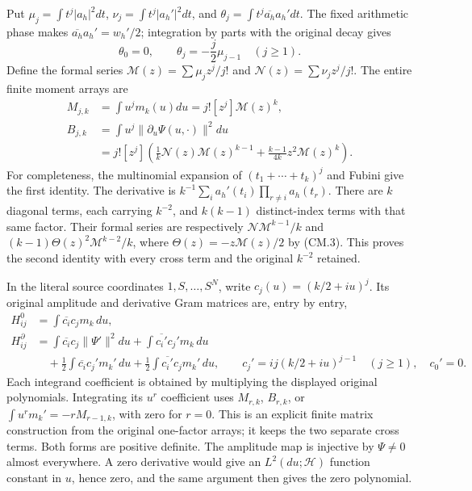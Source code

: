 Put \(\mu_j=\int t^j|a_h|^2dt\),
\(\nu_j=\int t^j|a_h'|^2dt\), and
\(\theta_j=\int t^j\overline{a_h}a_h'dt\).
The fixed arithmetic phase makes \(\overline{a_h}a_h'=w_h'/2\);
integration by parts with the original decay gives
\[
 \theta_0=0,\qquad \theta_j=-\frac j2\mu_{j-1}\quad(j\ge1).
 \tag{CM.3}
\]
Define the formal series \(\mathcal M(z)=\sum\mu_jz^j/j!\) and
\(\mathcal N(z)=\sum\nu_jz^j/j!\). The entire finite moment arrays are
\[
 \begin{aligned}
 M_{j,k}&=\int u^jm_k(u)du=j![z^j]\mathcal M(z)^k,\\
 B_{j,k}&=\int u^j\|\partial_u\Psi(u,\cdot)\|^2du\\
 &=j![z^j]\left(\frac1k\mathcal N(z)\mathcal M(z)^{k-1}
                 +\frac{k-1}{4k}z^2\mathcal M(z)^k\right).
 \end{aligned}
 \tag{CM.4}
\]
For completeness, the multinomial expansion of
\((t_1+\cdots+t_k)^j\) and Fubini give the first identity. The
derivative is \(k^{-1}\sum_i a_h'(t_i)\prod_{r\ne i}a_h(t_r)\).
There are \(k\) diagonal terms, each carrying \(k^{-2}\), and
\(k(k-1)\) distinct-index terms with that same factor. Their formal
series are respectively \(\mathcal N\mathcal M^{k-1}/k\) and
\((k-1)\Theta(z)^2\mathcal M^{k-2}/k\), where
\(\Theta(z)=-z\mathcal M(z)/2\) by (CM.3). This proves the second
identity with every cross term and the original \(k^{-2}\) retained.

In the literal source coordinates \(1,S,\ldots,S^N\), write
\(c_j(u)=(k/2+iu)^j\). Its original amplitude and derivative Gram
matrices are, entry by entry,
\[
 \begin{aligned}
 H^0_{ij}&=\int\overline{c_i}c_j m_k\,du,\\
 H^\partial_{ij}&=\int\overline{c_i}c_j\|\Psi'\|^2du
                  +\int\overline{c_i'}c_j'm_k\,du\\
 &\quad+\frac12\int\overline{c_i}c_j'm_k'\,du
                  +\frac12\int\overline{c_i'}c_jm_k'\,du,
 \qquad c_j'=ij(k/2+iu)^{j-1}\quad(j\ge1),\quad c_0'=0.
 \end{aligned}
 \tag{CM.5}
\]
Each integrand coefficient is obtained by multiplying the displayed
original polynomials. Integrating its \(u^r\) coefficient uses
\(M_{r,k}\), \(B_{r,k}\), or
\(\int u^rm_k'=-rM_{r-1,k}\), with zero for \(r=0\).
This is an explicit finite matrix construction from the original
one-factor arrays; it keeps the two separate cross terms.
Both forms are positive definite. The amplitude map is injective by
\(\Psi\ne0\) almost everywhere. A zero derivative would give an
\(L^2(du;\mathscr H)\) function constant in \(u\), hence zero,
and the same argument then gives the zero polynomial.

